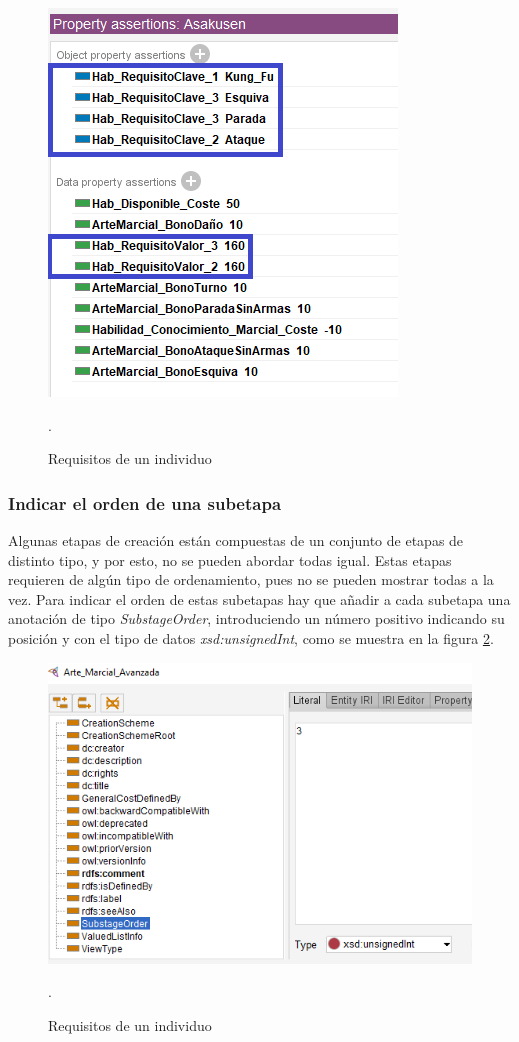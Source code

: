 \begin{figure}[ht]
    \centering
    \includegraphics[scale=0.6]{Figures/Protege/Requisitos.png}
    \caption{Requisitos de un individuo}.
    \label{requisitos}
\end{figure}

\subsubsection{Indicar el orden de una subetapa}
Algunas etapas de creación están compuestas de un conjunto de etapas de distinto tipo, y por esto, no se pueden abordar todas igual.
Estas etapas requieren de algún tipo de ordenamiento, pues no se pueden mostrar todas a la vez. Para indicar el orden de estas subetapas
hay que añadir a cada subetapa una anotación de tipo \textit{SubstageOrder}, introduciendo un número positivo indicando su posición 
y con el tipo de datos \textit{xsd:unsignedInt}, como se muestra en la figura \ref*{SubstageOrder}.

\begin{figure}[ht]
    \centering
    \includegraphics[scale=0.6]{Figures/Protege/SubstageOrder.png}
    \caption{Requisitos de un individuo}.
    \label{SubstageOrder}
\end{figure}

